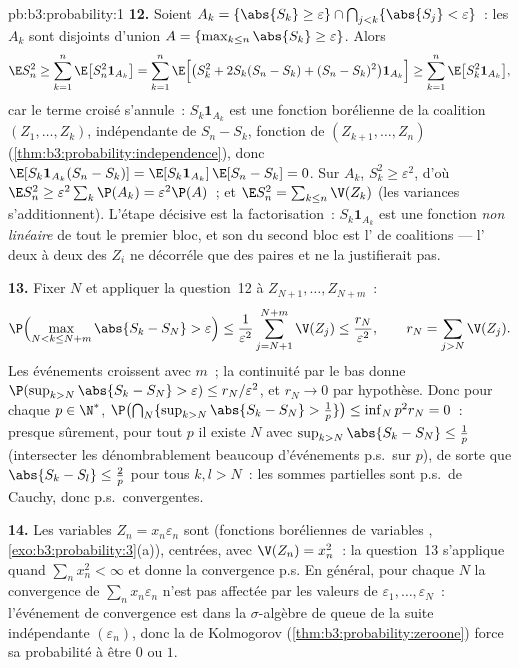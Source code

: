 \begin{solution}{pb:b3:probability:1}
\textbf{12.} Soient $A_k = \{\abs{S_k} \geq \varepsilon\}
\cap \bigcap_{j<k}\{\abs{S_j} < \varepsilon\}$~: les $A_k$
sont disjoints d'union $A = \{\max_{k\leq n}\abs{S_k} \geq
\varepsilon\}$. Alors
\[
\E S_n^2 \geq \sum_{k=1}^n\E\bigl[S_n^2\mathbf 1_{A_k}\bigr]
= \sum_{k=1}^n\E\Bigl[\bigl(S_k^2 + 2S_k(S_n - S_k) + (S_n
- S_k)^2\bigr)\mathbf 1_{A_k}\Bigr]
\geq \sum_{k=1}^n\E\bigl[S_k^2\mathbf 1_{A_k}\bigr],
\]
car le terme croisé s'annule~: $S_k\mathbf 1_{A_k}$ est une
fonction borélienne de la coalition $(Z_1, \dots, Z_k)$,
indépendante de $S_n - S_k$, fonction de $(Z_{k+1}, \dots,
Z_n)$ (\cref{thm:b3:probability:independence}), donc
$\E[S_k\mathbf 1_{A_k}(S_n - S_k)] = \E[S_k\mathbf
1_{A_k}]\,\E[S_n - S_k] = 0$. Sur $A_k$, $S_k^2 \geq
\varepsilon^2$, d'où $\E S_n^2 \geq
\varepsilon^2\sum_k\P(A_k) = \varepsilon^2\P(A)$~; et $\E
S_n^2 = \sum_{k\leq n}\V(Z_k)$ (les variances
s'additionnent). L'étape décisive est la factorisation~:
$S_k\mathbf 1_{A_k}$ est une fonction \emph{non linéaire}
de tout le premier bloc, et son  du second
bloc est l' de coalitions --- l'
deux à deux des $Z_i$ ne décorréle que des paires et ne la
justifierait pas.

\textbf{13.} Fixer $N$ et appliquer la question~12 à
$Z_{N+1}, \dots, Z_{N+m}$~:
\[
\P\Bigl(\max_{N < k \leq N+m}\abs{S_k - S_N} >
\varepsilon\Bigr) \leq
\frac1{\varepsilon^2}\sum_{j=N+1}^{N+m}\V(Z_j) \leq
\frac{r_N}{\varepsilon^2},
\qquad r_N = \sum_{j>N}\V(Z_j) .
\]
Les événements croissent avec $m$~; la continuité par le
bas donne $\P(\sup_{k>N}\abs{S_k - S_N} > \varepsilon)
\leq r_N/\varepsilon^2$, et $r_N \to 0$ par hypothèse.
Donc pour chaque $p \in \N^*$,
$\P\bigl(\bigcap_N\{\sup_{k>N}\abs{S_k - S_N} >
\frac1p\}\bigr) \leq \inf_Np^2r_N = 0$~: presque sûrement,
pour tout $p$ il existe $N$ avec $\sup_{k>N}\abs{S_k -
S_N} \leq \frac1p$ (intersecter les dénombrablement
beaucoup d'événements p.s.\ sur $p$), de sorte que
$\abs{S_k - S_l} \leq \frac2p$ pour tous $k, l > N$~: les
sommes partielles sont p.s.\ de Cauchy, donc p.s.\
convergentes.

\textbf{14.} Les variables $Z_n = x_n\varepsilon_n$ sont
 (fonctions boréliennes de variables
\omterm{def:b3:probability:independence}{indépendantes}, \cref{exo:b3:probability:3}(a)), centrées,
avec $\V(Z_n) = x_n^2$~: la question~13 s'applique quand
$\sum_nx_n^2 < \infty$ et donne la convergence p.s. En
général, pour chaque $N$ la convergence de
$\sum_nx_n\varepsilon_n$ n'est pas affectée par les
valeurs de $\varepsilon_1, \dots, \varepsilon_N$~:
l'événement de convergence est dans la $\sigma$-algèbre de
queue de la suite indépendante $(\varepsilon_n)$, donc la
 de Kolmogorov
(\cref{thm:b3:probability:zeroone}) force sa probabilité à
être $0$ ou $1$.


\end{solution}
